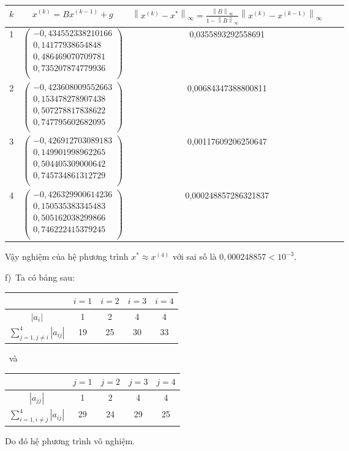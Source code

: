 \begin{longtable}{|c|Sc|Sc|}\hline
$k$&$x^{(k)}=Bx^{(k-1)}+g$&$\left\|x^{(k)}-x^*\right\|_{\infty}=\frac{\left\|B\right\|_{\infty}}{1-\left\|B\right\|_{\infty}}\left\|x^{(k)}-x^{(k-1)}\right\|_{\infty}$\\\hline
{}&$\begin{pmatrix}-0,434552338210166\\0,14177938654848\\0,486469070709781\\0,735207874779936\\\end{pmatrix}$&0,0355893292558691\\&$\begin{pmatrix}-0,423608009552663\\0,153478278907438\\0,507278817838622\\0,747795602682095\\\end{pmatrix}$&0,00684347388800811\\&$\begin{pmatrix}-0,426912703089183\\0,149901998962265\\0,504405309000642\\0,745734861312729\\\end{pmatrix}$&0,00117609206250647\\&$\begin{pmatrix}-0,426329900614236\\0,150535383345483\\0,505162038299866\\0,746222415379245\\\end{pmatrix}$&0,000248857286321837\\\hline
\end{longtable}

Vậy nghiệm của hệ phương trình $x^*\approx x^{(4)}$ với sai số là $0,000248857<10^{-3}$.\par

f)~Ta có bảng sau:
\begin{center}
\begin{tabular}{|c|c|c|c|c|}\hline
&$i=1$&$i=2$&$i=3$&$i=4$\\ \hline
$\left|a_i\right|$&1&2&4&4\\ \hline
$\sum\limits_{j=1, j\neq i}^{4} \left|a_{ij}\right|$&19&25&30&33\\ \hline
\end{tabular}~và~\begin{tabular}{|c|c|c|c|c|}\hline
& $j=1$ & $j=2$ & $j=3$ & $j=4$ \\ \hline
$\left|a_{jj}\right|$ & 1 & 2 & 4 & 4 \\ \hline
$\sum\limits_{i=1,i\neq j}^{4}\left|a_{ij}\right|$ & 29 & 24 & 29 & 25\\ \hline
\end{tabular}
\end{center}
Do đó hệ phương trình vô nghiệm.\par

